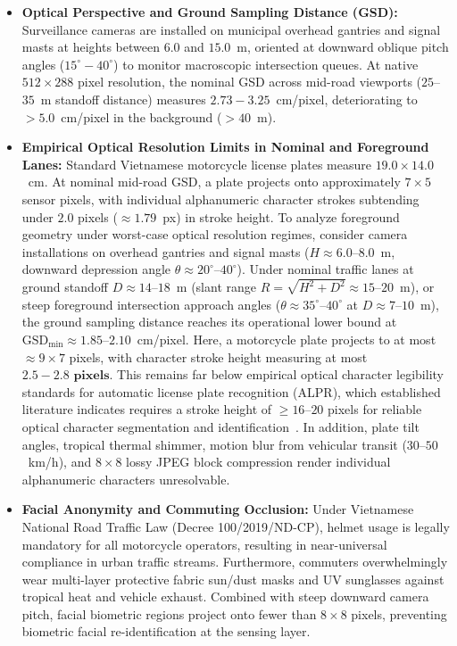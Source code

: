 \documentclass[preprint,12pt]{elsarticle}
\begin{document}
\begin{itemize}
    \item \textbf{Optical Perspective and Ground Sampling Distance (GSD):} Surveillance cameras are installed on municipal overhead gantries and signal masts at heights between $\mathbf{6.0}$ and $\mathbf{15.0}$~m, oriented at downward oblique pitch angles ($15^\circ - 40^\circ$) to monitor macroscopic intersection queues. At native $512 \times 288$ pixel resolution, the nominal GSD across mid-road viewports ($25$--$35$~m standoff distance) measures $\mathbf{2.73 - 3.25}$~cm/pixel, deteriorating to $>5.0$~cm/pixel in the background ($>40$~m).
    \item \textbf{Empirical Optical Resolution Limits in Nominal and Foreground Lanes:} Standard Vietnamese motorcycle license plates measure $19.0 \times 14.0$~cm. At nominal mid-road GSD, a plate projects onto approximately $7 \times 5$ sensor pixels, with individual alphanumeric character strokes subtending under $2.0$ pixels ($\approx 1.79$~px) in stroke height. To analyze foreground geometry under worst-case optical resolution regimes, consider camera installations on overhead gantries and signal masts ($H \approx 6.0$--$8.0$~m, downward depression angle $\theta \approx 20^\circ$--$40^\circ$). Under nominal traffic lanes at ground standoff $D \approx 14$--$18$~m (slant range $R = \sqrt{H^2 + D^2} \approx 15$--$20$~m), or steep foreground intersection approach angles ($\theta \approx 35^\circ$--$40^\circ$ at $D \approx 7$--$10$~m), the ground sampling distance reaches its operational lower bound at $\text{GSD}_{\min} \approx 1.85$--$2.10$~cm/pixel. Here, a motorcycle plate projects to at most $\approx 9 \times 7$ pixels, with character stroke height measuring at most $\mathbf{2.5 - 2.8\text{ pixels}}$. This remains far below empirical optical character legibility standards for automatic license plate recognition (ALPR), which established literature indicates requires a stroke height of $\ge 16$--$20$ pixels for reliable optical character segmentation and identification~\cite{du2013automatic}. In addition, plate tilt angles, tropical thermal shimmer, motion blur from vehicular transit ($30$--$50$~km/h), and $8 \times 8$ lossy JPEG block compression render individual alphanumeric characters unresolvable.
    \item \textbf{Facial Anonymity and Commuting Occlusion:} Under Vietnamese National Road Traffic Law (Decree 100/2019/ND-CP), helmet usage is legally mandatory for all motorcycle operators, resulting in near-universal compliance in urban traffic streams. Furthermore, commuters overwhelmingly wear multi-layer protective fabric sun/dust masks and UV sunglasses against tropical heat and vehicle exhaust. Combined with steep downward camera pitch, facial biometric regions project onto fewer than $8 \times 8$ pixels, preventing biometric facial re-identification at the sensing layer.

\end{itemize}
\end{document}
